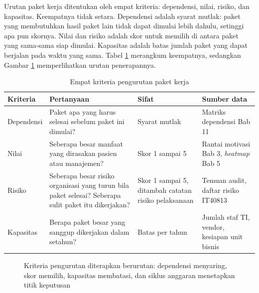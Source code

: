 Urutan paket kerja ditentukan oleh empat kriteria: dependensi, nilai, risiko,
dan kapasitas. Keempatnya tidak setara. Dependensi adalah syarat mutlak: paket
yang membutuhkan hasil paket lain tidak dapat dimulai lebih dahulu, setinggi
apa pun skornya. Nilai dan risiko adalah skor untuk memilih di antara paket
yang sama-sama siap dimulai. Kapasitas adalah batas jumlah paket yang dapat
berjalan pada waktu yang sama. Tabel \ref{tab:ch12-kriteria} merangkum
keempatnya, sedangkan Gambar \ref{fig:ch12-saringan} memperlihatkan urutan
penerapannya.

\begin{table}[!htb]
  \centering
  \caption{Empat kriteria pengurutan paket kerja}
  \label{tab:ch12-kriteria}
  \begin{tabularx}{\textwidth}{>{\raggedright\arraybackslash}p{1.6cm}
                               >{\raggedright\arraybackslash}X
                               >{\raggedright\arraybackslash}p{2.3cm}
                               >{\raggedright\arraybackslash}p{2.5cm}}
    \hline
    \textbf{Kriteria} & \textbf{Pertanyaan} & \textbf{Sifat} & \textbf{Sumber data} \\
    \hline
    De\-pen\-den\-si & Paket apa yang harus selesai sebelum paket ini dimulai? &
      Syarat mutlak & Matriks dependensi Bab 11 \\
    \hline
    Nilai & Seberapa besar manfaat yang dirasakan pasien atau manajemen? &
      Skor 1 sampai 5 & Rantai motivasi Bab 3, \textit{heatmap} Bab 5 \\
    \hline
    Risiko & Seberapa besar risiko organisasi yang turun bila paket selesai?
      Seberapa sulit paket itu dikerjakan? & Skor 1 sampai 5, ditambah
      catatan risiko pelaksanaan & Temuan audit, daftar risiko IT40813 \\
    \hline
    Kapasitas & Berapa paket besar yang sanggup dikerjakan dalam setahun? &
      Batas per tahun & Jumlah staf TI, vendor, kesiapan unit bisnis \\
    \hline
  \end{tabularx}
\end{table}

\begin{figure}[!htb]
  \centering
  
  \caption{Kriteria pengurutan diterapkan berurutan: dependensi menyaring,
           skor memilih, kapasitas membatasi, dan siklus anggaran menetapkan
           titik keputusan}
  \label{fig:ch12-saringan}
\end{figure}


